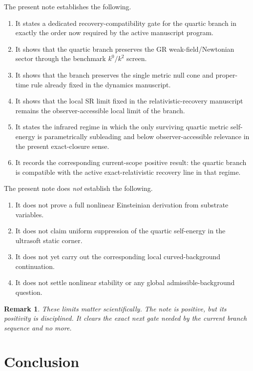\documentclass[11pt]{article}
\newtheorem{remark}{Remark}
\begin{document}
The present note establishes the following.
\begin{enumerate}
    \item It states a dedicated recovery-compatibility gate for the quartic branch in exactly the order now required by the active manuscript program.
    \item It shows that the quartic branch preserves the GR weak-field/Newtonian sector through the benchmark \(k^0/k^2\) screen.
    \item It shows that the branch preserves the single metric null cone and proper-time rule already fixed in the dynamics manuscript.
    \item It shows that the local SR limit fixed in the relativistic-recovery manuscript remains the observer-accessible local limit of the branch.
    \item It states the infrared regime in which the only surviving quartic metric self-energy is parametrically subleading and below observer-accessible relevance in the present exact-closure sense.
    \item It records the corresponding current-scope positive result: the quartic branch is compatible with the active exact-relativistic recovery line in that regime.
\end{enumerate}

The present note does \emph{not} establish the following.
\begin{enumerate}
    \item It does not prove a full nonlinear Einsteinian derivation from substrate variables.
    \item It does not claim uniform suppression of the quartic self-energy in the ultrasoft static corner.
    \item It does not yet carry out the corresponding local curved-background continuation.
    \item It does not settle nonlinear stability or any global admissible-background question.
\end{enumerate}

\begin{remark}
These limits matter scientifically. The note is positive, but its positivity is disciplined. It clears the exact next gate needed by the current branch sequence and no more.
\end{remark}

\section{Conclusion}
\end{document}
